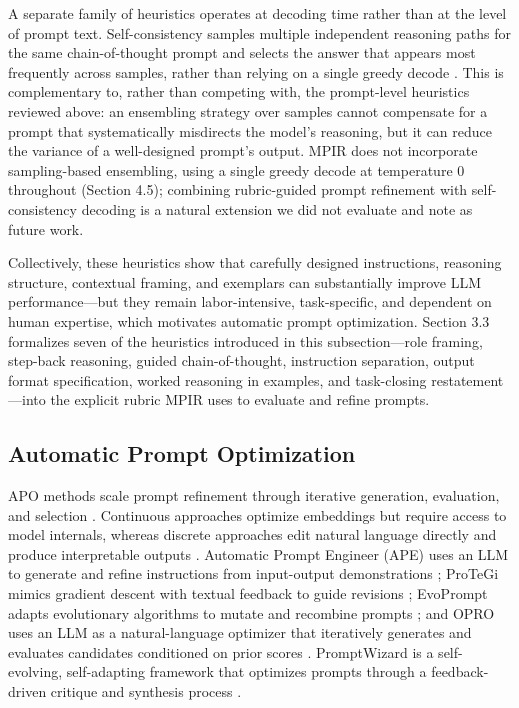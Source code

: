 \documentclass[a4paper,fleqn]{cas-sc}
\begin{document}
A separate family of heuristics operates at decoding time rather than at the level of prompt text. Self-consistency samples multiple independent reasoning paths for the same chain-of-thought prompt and selects the answer that appears most frequently across samples, rather than relying on a single greedy decode \citep{wang2023b}. This is complementary to, rather than competing with, the prompt-level heuristics reviewed above: an ensembling strategy over samples cannot compensate for a prompt that systematically misdirects the model's reasoning, but it can reduce the variance of a well-designed prompt's output. MPIR does not incorporate sampling-based ensembling, using a single greedy decode at temperature 0 throughout (Section 4.5); combining rubric-guided prompt refinement with self-consistency decoding is a natural extension we did not evaluate and note as future work.

Collectively, these heuristics show that carefully designed instructions, reasoning structure, contextual framing, and exemplars can substantially improve LLM performance---but they remain labor-intensive, task-specific, and dependent on human expertise, which motivates automatic prompt optimization. Section 3.3 formalizes seven of the heuristics introduced in this subsection---role framing, step-back reasoning, guided chain-of-thought, instruction separation, output format specification, worked reasoning in examples, and task-closing restatement---into the explicit rubric MPIR uses to evaluate and refine prompts.

\subsection{Automatic Prompt Optimization}

APO methods scale prompt refinement through iterative generation, evaluation, and selection \citep{ramnath2025}. Continuous approaches optimize embeddings but require access to model internals, whereas discrete approaches edit natural language directly and produce interpretable outputs \citep{cui2025}. Automatic Prompt Engineer (APE) uses an LLM to generate and refine instructions from input-output demonstrations \citep{zhou2023}; ProTeGi mimics gradient descent with textual feedback to guide revisions \citep{pryzant2023}; EvoPrompt adapts evolutionary algorithms to mutate and recombine prompts \citep{guo2024}; and OPRO uses an LLM as a natural-language optimizer that iteratively generates and evaluates candidates conditioned on prior scores \citep{yang2024}. PromptWizard is a self-evolving, self-adapting framework that optimizes prompts through a feedback-driven critique and synthesis process \citep{agarwal2025}.
\end{document}
